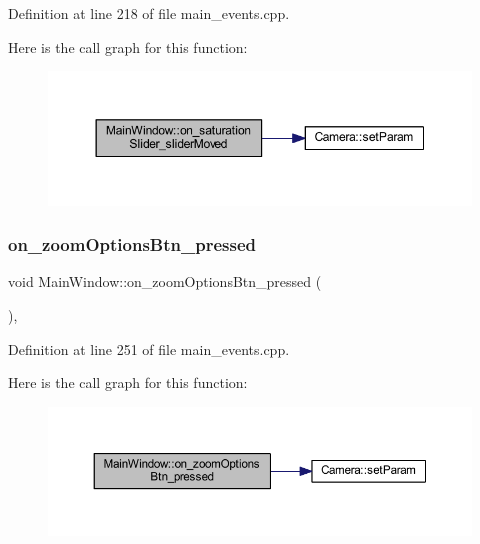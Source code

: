 Definition at line 218 of file main\+\_\+events.\+cpp.

Here is the call graph for this function\+:
\nopagebreak
\begin{figure}[H]
\begin{center}
\leavevmode
\includegraphics[width=350pt]{classMainWindow_abd0b71ebb4667aa574bfa870ade22f58_cgraph}
\end{center}
\end{figure}
\mbox{\label{classMainWindow_aaf176f5c10001cdcf845f1250232be9a}} 
\subsubsection{\texorpdfstring{on\_zoomOptionsBtn\_pressed}{on\_zoomOptionsBtn\_pressed}}
{\footnotesize\ttfamily void Main\+Window\+::on\+\_\+zoom\+Options\+Btn\+\_\+pressed (\begin{DoxyParamCaption}{ }\end{DoxyParamCaption})\hspace{0.3cm}{\ttfamily [private]}, {\ttfamily [slot]}}



Definition at line 251 of file main\+\_\+events.\+cpp.

Here is the call graph for this function\+:
\nopagebreak
\begin{figure}[H]
\begin{center}
\leavevmode
\includegraphics[width=350pt]{classMainWindow_aaf176f5c10001cdcf845f1250232be9a_cgraph}
\end{center}
\end{figure}
\mbox{\label{classMainWindow_a6ae3fbe8e4f3f10db4f2e0e495b98841}} 
